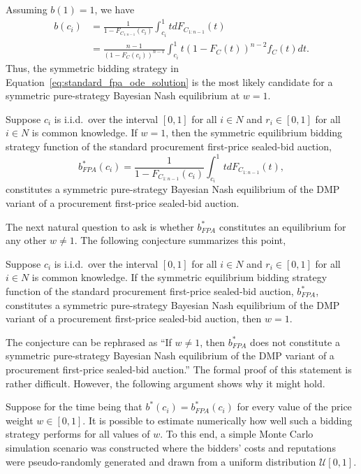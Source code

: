 Assuming $b(1) = 1$, we have
\begin{align}
	\label{eq:standard_fpa_ode_solution}
	b(c_i) &= \frac{1}{1 - F_{C_{1:n-1}}(c_i)}\int_{c_i}^{1} tdF_{C_{1:n-1}}(t) \nonumber\\
	&= \frac{n-1}{(1 - F_{C}(c_i))^{n-1}}\int_{c_i}^1 t(1-F_C(t))^{n-2}f_C(t)dt.
\end{align}
Thus, the symmetric bidding strategy in Equation~\eqref{eq:standard_fpa_ode_solution} is the most likely candidate for a symmetric pure-strategy Bayesian Nash equilibrium at $w=1$.
\begin{proposition}
\label{prop:special_case_w_1}
Suppose $c_i$ is i.i.d.~over the interval $[0,1]$ for all $i\in N$ and $r_i \in [0,1]$ for all $i\in N$ is common knowledge. If $w=1$, then the symmetric equilibrium bidding strategy function of the standard procurement first-price sealed-bid auction,
\begin{equation}
	\label{eq:standard_fpa}
	b^*_{FPA}(c_i) = \frac{1}{1 - F_{C_{1:n-1}}(c_i)}\int_{c_i}^{1} tdF_{C_{1:n-1}}(t),
\end{equation}
constitutes a symmetric pure-strategy Bayesian Nash equilibrium of the DMP variant of a procurement first-price sealed-bid auction.
\end{proposition}

The next natural question to ask is whether $b^*_{FPA}$ constitutes an equilibrium for any other $w\neq 1$. The following conjecture summarizes this point,
\begin{conjecture}
\label{conj:special_case_w_1}
Suppose $c_i$ is i.i.d.~over the interval $[0,1]$ for all $i\in N$ and $r_i \in [0,1]$ for all $i\in N$ is common knowledge. If the symmetric equilibrium bidding strategy function of the standard procurement first-price sealed-bid auction, $b^*_{FPA}$, constitutes a symmetric pure-strategy Bayesian Nash equilibrium of the DMP variant of a procurement first-price sealed-bid auction, then $w=1$.
\end{conjecture}
The conjecture can be rephrased as ``If $w\neq 1$, then $b^*_{FPA}$ does not constitute a symmetric pure-strategy Bayesian Nash equilibrium of the DMP variant of a procurement first-price sealed-bid auction.'' The formal proof of this statement is rather difficult. However, the following argument shows why it might hold.

Suppose for the time being that $b^*(c_i) = b_{FPA}^*(c_i)$ for every value of the price weight $w\in [0,1]$. It is possible to estimate numerically how well such a bidding strategy performs for all values of $w$. To this end, a simple Monte Carlo simulation scenario was constructed where the bidders' costs and reputations were pseudo-randomly generated and drawn from a uniform distribution $\mathcal{U}[0,1]$.

